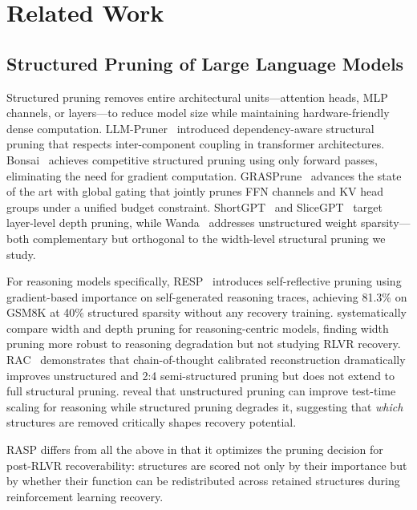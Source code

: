 \section{Related Work}
\label{sec:related}

\subsection{Structured Pruning of Large Language Models}
\label{sec:rw_pruning}

Structured pruning removes entire architectural units---attention heads, MLP channels, or layers---to reduce model size while maintaining hardware-friendly dense computation.
LLM-Pruner~\citep{llmpruner2023} introduced dependency-aware structural pruning that respects inter-component coupling in transformer architectures.
Bonsai~\citep{bonsai2025} achieves competitive structured pruning using only forward passes, eliminating the need for gradient computation.
GRASPrune~\citep{graspprune2026} advances the state of the art with global gating that jointly prunes FFN channels and KV head groups under a unified budget constraint.
ShortGPT~\citep{shortgpt2024} and SliceGPT~\citep{slicegpt2024} target layer-level depth pruning, while Wanda~\citep{wanda2024} addresses unstructured weight sparsity---both complementary but orthogonal to the width-level structural pruning we study.

For reasoning models specifically, RESP~\citep{resp2025} introduces self-reflective pruning using gradient-based importance on self-generated reasoning traces, achieving 81.3\% on GSM8K at 40\% structured sparsity without any recovery training.
\citet{llms2lrms2026} systematically compare width and depth pruning for reasoning-centric models, finding width pruning more robust to reasoning degradation but not studying RLVR recovery.
RAC~\citep{rac2025} demonstrates that chain-of-thought calibrated reconstruction dramatically improves unstructured and 2:4 semi-structured pruning but does not extend to full structural pruning.
\citet{doingmore2026} reveal that unstructured pruning can improve test-time scaling for reasoning while structured pruning degrades it, suggesting that \emph{which} structures are removed critically shapes recovery potential.

RASP differs from all the above in that it optimizes the pruning decision for post-RLVR recoverability: structures are scored not only by their importance but by whether their function can be redistributed across retained structures during reinforcement learning recovery.

